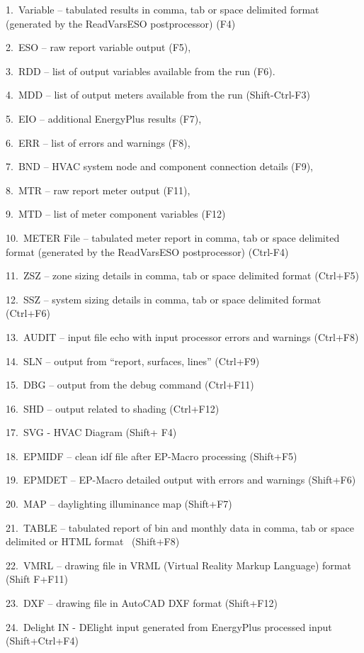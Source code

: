 1.~Variable -- tabulated results in comma, tab or space delimited format (generated by the ReadVarsESO postprocessor) (F4)

2.~ESO -- raw report variable output (F5),

3.~RDD -- list of output variables available from the run (F6).

4.~MDD -- list of output meters available from the run (Shift-Ctrl-F3)

5.~EIO -- additional EnergyPlus results (F7),

6.~ERR -- list of errors and warnings (F8),

7.~BND -- HVAC system node and component connection details (F9),

8.~MTR -- raw report meter output (F11),

9.~MTD -- list of meter component variables (F12)

10.~METER File -- tabulated meter report in comma, tab or space delimited format (generated by the ReadVarsESO postprocessor) (Ctrl-F4)

11.~ZSZ -- zone sizing details in comma, tab or space delimited format (Ctrl+F5)

12.~SSZ -- system sizing details in comma, tab or space delimited format (Ctrl+F6)

13.~AUDIT -- input file echo with input processor errors and warnings (Ctrl+F8)

14.~SLN -- output from ``report, surfaces, lines'' (Ctrl+F9)

15.~DBG -- output from the debug command (Ctrl+F11)

16.~SHD -- output related to shading (Ctrl+F12)

17.~SVG - HVAC Diagram (Shift+ F4)

18.~EPMIDF -- clean idf file after EP-Macro processing (Shift+F5)

19.~EPMDET -- EP-Macro detailed output with errors and warnings (Shift+F6)

20.~MAP -- daylighting illuminance map (Shift+F7)

21.~TABLE -- tabulated report of bin and monthly data in comma, tab or space delimited or HTML format~ (Shift+F8)

22.~VMRL -- drawing file in VRML (Virtual Reality Markup Language) format (Shift F+F11)

23.~DXF -- drawing file in AutoCAD DXF format (Shift+F12)

24.~Delight IN - DElight input generated from EnergyPlus processed input (Shift+Ctrl+F4)

